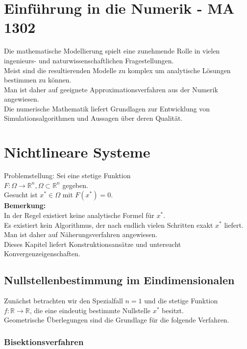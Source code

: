 \documentclass[10pt,a4paper]{article}
\begin{document}
\section*{Einführung in die Numerik - MA 1302}
Die mathematische Modellierung spielt eine zunehmende Rolle in vielen ingenieurs- und naturwissenschaftlichen Fragestellungen.
\\Meist sind die resultierenden Modelle zu komplex um analytische Lösungen bestimmen zu können. 
\\Man ist daher auf geeignete Approximationsverfahren aus der Numerik angewiesen.\\
Die numerische Mathematik liefert Grundlagen zur Entwicklung von Simulationsalgorithmen und Aussagen über deren Qualität.


\section{Nichtlineare Systeme}
Problemstellung: Sei eine stetige Funktion
\\$F: \Omega \longrightarrow \mathbb{R}^n, \Omega \subset \mathbb{R}^n$ gegeben.
\\Gesucht ist $x^*\in \Omega$ mit $F(x^*)=0$.
\newline
\\\textbf{Bemerkung:} 
\\In der Regel existiert keine analytische Formel für $x^*$.
\\Es existiert kein Algorithmus, der nach endlich vielen Schritten exakt $x^*$ liefert.
\\Man ist daher auf Näherungsverfahren angewiesen.
\\Dieses Kapitel liefert Konstruktionsansätze und untersucht Konvergenzeigenschaften.
\subsection{Nullstellenbestimmung im Eindimensionalen}
Zunächst betrachten wir den Spezialfall $n=1$ und die stetige Funktion 
\\$f: \mathbb{R} \longrightarrow \mathbb{R}$, die eine eindeutig bestimmte Nullstelle $x^*$ besitzt.
\\Geometrische Überlegungen sind die Grundlage für die folgende Verfahren.
\subsubsection{Bisektionsverfahren}
\end{document}
